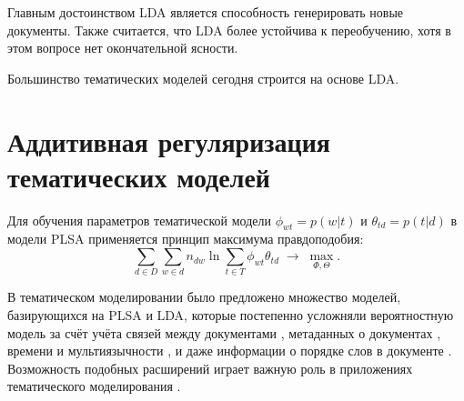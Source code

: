 

Главным достоинством LDA является способность генерировать новые документы. Также считается, что LDA более устойчива к переобучению, хотя в этом вопросе нет окончательной ясности.

Большинство тематических моделей сегодня строится на основе LDA.

\section{Аддитивная регуляризация тематических моделей}

Для обучения параметров тематической модели $\phi_{wt}=p(w|t)$ и $\theta_{td}=p(t|d)$ в модели PLSA применяется принцип максимума  правдоподобия:
\begin{equation}
\label{eq:logL}
    \sum_{d\in D} \sum_{w\in d} n_{dw} \ln
        \sum_{t\in T}
            \phi_{wt}\theta_{td}
    \;\to\; \max_{\Phi,\Theta}.
\end{equation}

В тематическом моделировании было предложено множество моделей, базирующихся на PLSA и LDA, которые постепенно усложняли вероятностную модель за счёт учёта связей между документами \cite{cohn2001missing,mccallum2005author,nallapati2008link}, метаданных о документах \cite{steyvers2004probabilistic},
времени и мультиязычности \cite{zosa-granroth-wilding-2019-multilingual}, и даже информации о порядке слов в документе \cite{gruber2007hidden,wallach2006topic}. Возможность подобных расширений играет важную роль в приложениях тематического моделирования \cite{fntir2017applications}.

